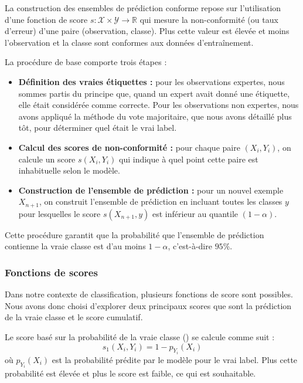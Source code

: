 \documentclass[a4paper,12pt]{article}
\begin{document}
La construction des ensembles de prédiction conforme repose sur l'utilisation d'une fonction de score $s : \mathcal{X} \times \mathcal{Y} \rightarrow \mathbb{R}$ qui mesure la non-conformité (ou taux d'erreur) d'une paire (observation, classe). Plus cette valeur est élevée et moins l'observation et la classe sont conformes aux données d'entraînement.

\vspace{0.2cm}

La procédure de base comporte trois étapes : 
\begin{itemize}
    \item \textbf{Définition des vraies étiquettes :} pour les observations expertes, nous sommes partis du principe que, quand un expert avait donné une étiquette, elle était considérée comme correcte. Pour les observations non expertes, nous avons appliqué la méthode du vote majoritaire, que nous avons détaillé plus tôt, pour déterminer quel était le vrai label.
    \item \textbf{Calcul des scores de non-conformité :} pour chaque paire $(X_i, Y_i)$, on calcule un score $s(X_i, Y_i)$ qui indique à quel point cette paire est inhabituelle selon le modèle.
    \item \textbf{Construction de l'ensemble de prédiction :} pour un nouvel exemple $X_{n+1}$, on construit l'ensemble de prédiction en incluant toutes les classes $y$ pour lesquelles le score $s(X_{n+1}, y)$ est inférieur au quantile $(1- \alpha)$.
\end{itemize}

\vspace{0.2cm}

Cette procédure garantit que la probabilité que l'ensemble de prédiction contienne la vraie classe est d'au moins $1- \alpha$, c'est-à-dire $95\%$.

\subsubsection{Fonctions de scores}

Dans notre contexte de classification, plusieurs fonctions de score sont possibles. Nous avons donc choisi d'explorer deux principaux scores que sont la prédiction de la vraie classe et le score cumulatif.

\vspace{0.2cm}

Le score basé sur la probabilité de la vraie classe (\cite{Vovk}) se calcule comme suit : 
$$ s_1(X_i, Y_i) = 1 - p_{Y_i}(X_i) $$ où $p_{Y_i}(X_i)$ est la probabilité prédite par le modèle pour le vrai label. Plus cette probabilité est élevée et plus le score est faible, ce qui est souhaitable.
\end{document}
